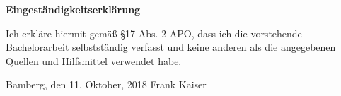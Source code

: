 
\textbf{Eingeständigkeitserklärung}
\vspace{2cm}

Ich erkläre hiermit gemäß §17 Abs. 2 APO, dass ich die vorstehende Bachelorarbeit
selbstständig verfasst und keine anderen als die angegebenen Quellen und Hilfsmittel
verwendet habe.

\vspace{2cm}

Bamberg, den 11. Oktober, 2018 \hspace{3cm} Frank Kaiser
